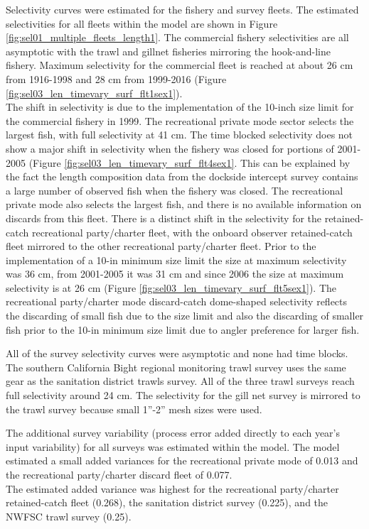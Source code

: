\documentclass[12pt,]{article}
\begin{document}
Selectivity curves were estimated for the fishery and survey fleets. The
estimated selectivities for all fleets within the model are shown in
Figure \ref{fig:sel01_multiple_fleets_length1}. The commercial fishery
selectivities are all asymptotic with the trawl and gillnet fisheries
mirroring the hook-and-line fishery. Maximum selectivity for the
commercial fleet is reached at about 26 cm from 1916-1998 and 28 cm from
1999-2016 (Figure \ref{fig:sel03_len_timevary_surf_flt1sex1}).\\
The shift in selectivity is due to the implementation of the 10-inch
size limit for the commercial fishery in 1999. The recreational private
mode sector selects the largest fish, with full selectivity at 41 cm.
The time blocked selectivity does not show a major shift in selectivity
when the fishery was closed for portions of 2001-2005 (Figure
\ref{fig:sel03_len_timevary_surf_flt4sex1}. This can be explained by the
fact the length composition data from the dockside intercept survey
contains a large number of observed fish when the fishery was closed.
The recreational private mode also selects the largest fish, and there
is no available information on discards from this fleet. There is a
distinct shift in the selectivity for the retained-catch recreational
party/charter fleet, with the onboard observer retained-catch fleet
mirrored to the other recreational party/charter fleet. Prior to the
implementation of a 10-in minimum size limit the size at maximum
selectivity was 36 cm, from 2001-2005 it was 31 cm and since 2006 the
size at maximum selectivity is at 26 cm (Figure
\ref{fig:sel03_len_timevary_surf_flt5sex1}). The recreational
party/charter mode discard-catch dome-shaped selectivity reflects the
discarding of small fish due to the size limit and also the discarding
of smaller fish prior to the 10-in minimum size limit due to angler
preference for larger fish.

All of the survey selectivity curves were asymptotic and none had time
blocks.\\
The southern California Bight regional monitoring trawl survey uses the
same gear as the sanitation district trawls survey. All of the three
trawl surveys reach full selectivity around 24 cm. The selectivity for
the gill net survey is mirrored to the trawl survey because small
1''-2'' mesh sizes were used.

The additional survey variability (process error added directly to each
year's input variability) for all surveys was estimated within the
model. The model estimated a small added variances for the recreational
private mode of 0.013 and the recreational party/charter discard fleet
of 0.077.\\
The estimated added variance was highest for the recreational
party/charter retained-catch fleet (0.268), the sanitation district
survey (0.225), and the NWFSC trawl survey (0.25).
\end{document}
